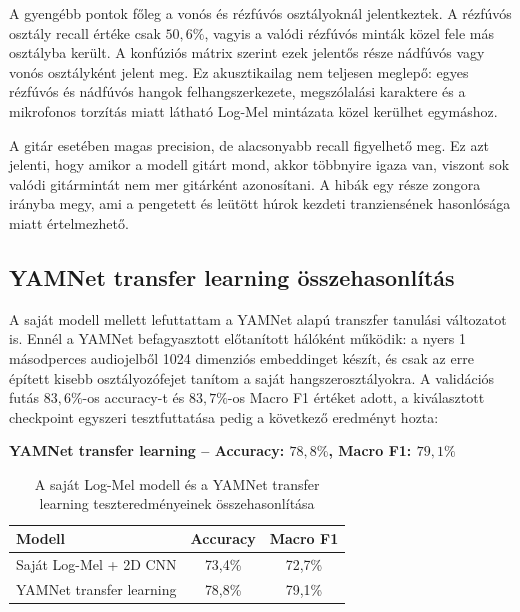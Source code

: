 A gyengébb pontok főleg a vonós és rézfúvós osztályoknál jelentkeztek. A rézfúvós osztály recall értéke csak \(50{,}6\%\), vagyis a valódi rézfúvós minták közel fele más osztályba került. A konfúziós mátrix szerint ezek jelentős része nádfúvós vagy vonós osztályként jelent meg. Ez akusztikailag nem teljesen meglepő: egyes rézfúvós és nádfúvós hangok felhangszerkezete, megszólalási karaktere és a mikrofonos torzítás miatt látható Log-Mel mintázata közel kerülhet egymáshoz.

A gitár esetében magas precision, de alacsonyabb recall figyelhető meg. Ez azt jelenti, hogy amikor a modell gitárt mond, akkor többnyire igaza van, viszont sok valódi gitármintát nem mer gitárként azonosítani. A hibák egy része zongora irányba megy, ami a pengetett és leütött húrok kezdeti tranziensének hasonlósága miatt értelmezhető.

\subsection{YAMNet transfer learning összehasonlítás}
\label{subsec:yamnet_test}

A saját modell mellett lefuttattam a YAMNet alapú transzfer tanulási változatot is. Ennél a YAMNet befagyasztott előtanított hálóként működik: a nyers 1 másodperces audiojelből 1024 dimenziós embeddinget készít, és csak az erre épített kisebb osztályozófejet tanítom a saját hangszerosztályokra. A validációs futás \(83{,}6\%\)-os accuracy-t és \(83{,}7\%\)-os Macro F1 értéket adott, a kiválasztott checkpoint egyszeri tesztfuttatása pedig a következő eredményt hozta:

\begin{center}
\textbf{YAMNet transfer learning -- Accuracy: \(78{,}8\%\), Macro F1: \(79{,}1\%\)}
\end{center}

\begin{table}[H]
\centering
\caption{A saját Log-Mel modell és a YAMNet transfer learning teszteredményeinek összehasonlítása}
\label{tab:logmel_yamnet_test_comparison}
\begin{tabular}{lcc}
\toprule
\textbf{Modell} & \textbf{Accuracy} & \textbf{Macro F1} \\
\midrule
Saját Log-Mel + 2D CNN & 73,4\% & 72,7\% \\
YAMNet transfer learning & 78,8\% & 79,1\% \\
\bottomrule
\end{tabular}
\end{table}

